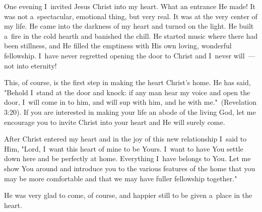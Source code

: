 \documentclass[a4paper,12pt]{article}
\begin{document}
\begin{multicols}{2}
One evening I~invited Jesus Christ into my heart. What an entrance He made! It was not a~spectacular, emotional thing, but very real. It was at the very center of my life. He came into the darkness of my heart and turned on the light. He built a~fire in the cold hearth and banished the chill. He started music where there had been stillness, and He filled the emptiness with His own loving, wonderful fellowship. I~have never regretted opening the door to Christ and I~never will~--- not into eternity! 

This, of course, is the first step in making the heart Christ's home. He has said, "Behold I~stand at the door and knock: if any man hear my voice and open the door, I~will come in to him, and will sup with him, and he with me."~(Revelation 3:20). If you are interested in making your life an abode of 
the living God, let me encourage you to invite Christ into your heart and He will surely come. 

After Christ entered my heart and in the joy of this new relationship I~said to Him, "Lord, I~want this heart of mine to be Yours. I~want to have You settle down here and be perfectly at home. Everything I~have belongs to You. Let me show You around and introduce you to the various features of the home that you may be more comfortable and that we may have fuller fellowship 
together." 

He was very glad to come, of course, and happier still to be given a~place in the heart.
\end{multicols}
\end{document}
